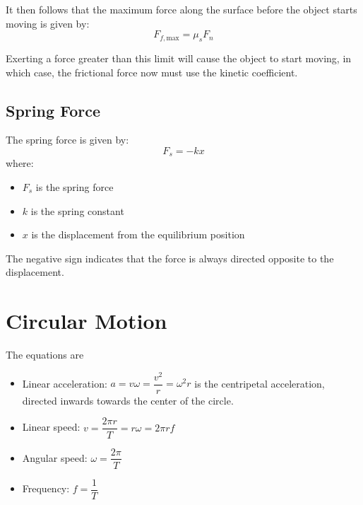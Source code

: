\documentclass[a4paper,12pt]{article}
\let\oldsection\section
\renewcommand\section{\clearpage\oldsection}
\begin{document}
It then follows that the maximum force along the surface before the object starts moving is given by:
$$F_{f, \text{max}} = \mu_s F_n$$

Exerting a force greater than this limit will cause the object to start moving, in which case, the frictional force now must use the kinetic coefficient.

\pagebreak

\subsection{Spring Force}

The spring force is given by:
$$F_s = -kx$$
where:
\begin{itemize}
  \item $F_s$ is the spring force
  \item $k$ is the spring constant
  \item $x$ is the displacement from the equilibrium position
\end{itemize}
The negative sign indicates that the force is always directed opposite to the displacement.


\pagebreak

\section{Circular Motion}

The equations are
\begin{itemize}
  \item Linear acceleration: $a = v\omega = \dfrac{v^2}{r} = \omega^2r$ is the centripetal acceleration, directed inwards towards the center of the circle.
  \item Linear speed: $v = \dfrac{2\pi r}{T} = r\omega = 2\pi r f$
  \item Angular speed: $\omega = \dfrac{2\pi}{T}$
  \item Frequency: $f = \dfrac{1}{T}$
\end{itemize}
\end{document}
